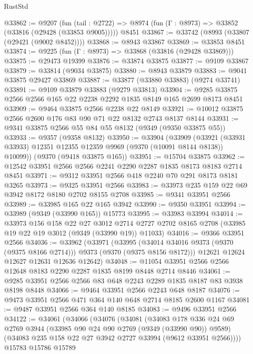 \begin{lexlean}{RustStd}
\begin{coremodule}
@33862 := @9207
    (fun (tail : @2722) => @8974 (fun (Γ : @8973) => @33852 (@33816 (@29428 (@33853 @9005)))))
    @8451
@33867 := @33742 (@8993 (@33807 (@29421 (@9002 @8452))))
@33868 := @8943 @33867
@33869 := @33853 @8451
@33874 := @9225 (fun (Γ : @8973) => @33868 (@33816 (@29428 @33869)))
@33875 := @29473 @19399
@33876 := @33874 @33875
@33877 := @9109 @33867
@33879 := @33814 (@9034 @33875)
@33880 := @8943 @33879
@33883 := @9041 @33875 @29427 @33869
@33887 := @33877 (@33880 @33883) (@9274 @33741)
@33891 := @9109 @33879 @33883 (@9279 @33813)
@33904 := @9285 @33875 @2566 @2566 @165 @22 @2238 @2292 @1835 @8149 @165 @2699 @8173 @8451
@33909 := @9464 @33875 @2566 @2238 @22 @8149
@33921 := @10012 @33875 @2566 @2600 @176 @83 @90 @71 @22 @8132 @2743 @8137 @8144
@33931 := @9341 @33875 @2566 @55 @84 @55 @8132 (@9349 (@9350 @33875 @55))
@33933 := @9357 (@9358 @8132)
@33950 := @33904
    (@33909 (@33921 (@33931 @33933) @12351 @12355 @12359 @9969 (@9370 (@10091 @8144 @8138)) @10099))
    (@9370 (@9418 @33875 @165))
@33951 := @15704 @33875
@33962 := @12542 @33951 @2566 @2566 @2241 @2290 @2287 @1835 @8173 @8183 @2714 @8451
@33971 := @9312 @33951 @2566 @418 @2240 @70 @291 @8173 @8181 @3265
@33973 := @9325 @33951 @2566
@33983 := @33973 @235 @159 @22 @69 @3942 @8172 @8180 @2702 @8155 @2708
@33985 := @9341 @33951 @2566
@33989 := @33985 @165 @22 @165 @3942
@33990 := @9350 @33951
@33994 := @33989 (@9349 (@33990 @165)) @15773
@33995 := @33983 @33994
@34014 := @33973
    @156
    @158
    @22
    @27
    @3012
    @2714
    @2727
    @2702
    @8165
    @2708
    (@33985 @19 @22 @19 @3012 (@9349 (@33990 @19)) @11033)
@34016 := @9366 @33951 @2566
@34036 := @33962
    (@33971
      (@33995 (@34014 @34016 @9373 (@9370 (@9375 @8166 @2714))) @9373 (@9370 (@9375 @8156 @8172)))
      @12621
      @12624
      @12627
      @12631
      @12636
      @12642)
@34048 := @11054 @33951 @2566 @2566 @12648 @8183 @2290 @2287 @1835 @8199 @8448 @2714 @8446
@34061 := @9285 @33951 @2566 @2566 @83 @648 @2243 @2289 @1835 @8187 @83 @3938 @8198 @8448
@34066 := @9464 @33951 @2566 @2243 @648 @8187
@34076 := @9473 @33951 @2566 @471 @364 @140 @648 @2714 @8185 @2600 @1167
@34081 := @9487 @33951 @2566 @364 @140 @8185
@34083 := @9496 @33951 @2566
@34122 := @34061
    (@34066
      (@34076
        (@34081
          (@34083
            @178
            @336
            @24
            @69
            @2769
            @3944
            (@33985 @90 @24 @90 @2769 (@9349 (@33990 @90)) @9589)
            (@34083 @235 @158 @22 @27 @3942 @2727 @33994 (@9612 @33951 @2566))))
        @15783
        @15786
        @15789

\end{coremodule}
\end{lexlean}
